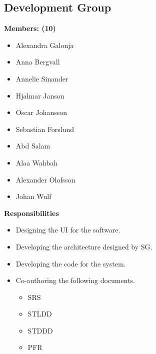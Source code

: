 \documentclass{article}
\begin{document}
    \subsection{Development Group}
        \textbf{Members: (10)}
        \begin{itemize}
            \item Alexandra Galonja
            \item Anna Bergvall
            \item Annelie Sinander
            \item Hjalmar Janson
            \item Oscar Johansson
            \item Sebastian Forslund
            \item Abd Salam
            \item Alaa Wahbah
            \item Alexander Olofsson
            \item Johan Wulf
        \end{itemize}
        \textbf{Responsibilities}
        \begin{itemize}
            \item Designing the UI for the software.
            \item Developing the architecture designed by SG.
            \item Developing the code for the system.
            \item Co-authoring the following documents.
                \begin{itemize}
                    \item SRS
                    \item STLDD
                    \item STDDD
                    \item PFR
                \end{itemize}
        \end{itemize}
    
\end{document}
